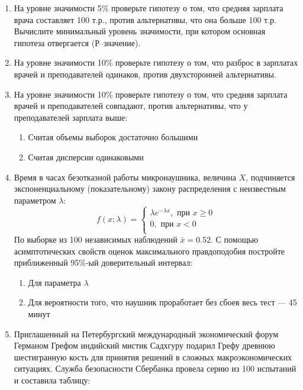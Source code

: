\begin{enumerate}[resume]

	\item На уровне значимости 5\% проверьте гипотезу о том, что средняя зарплата врача составляет 100 т.р., против альтернативы, что она больше 100 т.р.  Вычислите минимальный уровень значимости, при котором основная гипотеза отвергается (Р–значение).

	\item На уровне значимости 10\% проверьте гипотезу о том, что разброс в зарплатах врачей и преподавателей одинаков, против двухсторонней альтернативы.

	\item На уровне значимости 10\% проверьте гипотезу о том, что средняя зарплата врачей и преподавателей совпадают, против альтернативы, что у преподавателей зарплата выше:

	\begin{enumerate}
	\item Считая объемы выборок достаточно большими
			\item Считая дисперсии одинаковыми
	 \end{enumerate}

			\item Время в часах безотказной работы  микронаушника, величина $X$, подчиняется экспоненциальному (показательному) закону распределения с неизвестным параметром $\lambda$:
\[
f(x;\lambda)
			=\begin{cases}
			\lambda e^{-\lambda x},\text{ при } x\geq0\\
			0, \text{ при }  x<0\\
			\end{cases}
\]
По выборке из 100 независимых наблюдений $\bar x=0.52$. С помощью асимптотических свойств оценок максимального правдоподобия постройте приближенный 95\%-ый доверительный интервал:

\begin{enumerate}
	\item Для параметра $\lambda$
			\item Для вероятности того, что наушник проработает без сбоев весь тест — 45 минут
	 \end{enumerate}

	 \item Приглашенный на Петербургский международный экономический форум Германом Грефом индийский мистик Садхгуру подарил Грефу древнюю шестигранную кость для принятия решений в сложных макроэкономических ситуациях. Служба безопасности Сбербанка провела серию из 100 испытаний и составила таблицу:


\end{enumerate}
